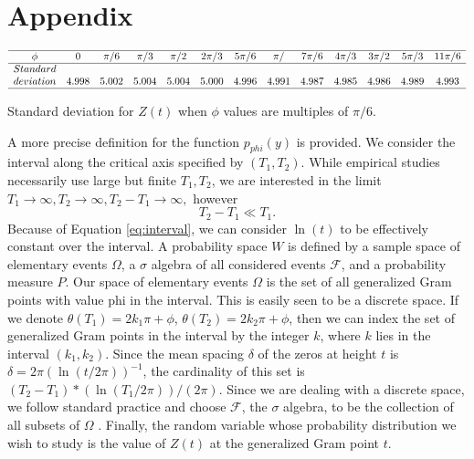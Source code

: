 \documentclass{mcom-l}
\theoremstyle{definition}
\theoremstyle{remark}
\numberwithin{equation}{section}
\begin{document}
\section*{\label{appendix} Appendix}

\begin{table}
\centering \(\begin{array}{ccccccccccccc}
\hline
\phi & 0& \pi/6 &  \pi/3 &  \pi/2 & 2 \pi/3 & 5\pi/6 & \pi/ & 7\pi/6 & 4\pi/3 & 3\pi/2 & 5\pi/3 & 11\pi/6 \\
\hline
Standard& \\
deviation & 4.998& 5.002& 5.004& 5.004& 5.000& 4.996& 4.991& 4.987& 4.985& 4.986& 4.989& 4.993\\
\hline
\end{array}\)
\caption{Standard deviation for  $Z(t)$ when $\phi$ values are multiples of $\pi/6$.}
\label{tab:stddev6}
\end{table}

A more precise definition for the function $p_{phi}(y)$ is provided. We consider the interval along the critical axis specified by $(T_1, T_2)$. While empirical studies necessarily use large but finite  $T_1, T_2$, we are interested in the limit 
$T_1 \rightarrow \infty, T_2 \rightarrow \infty,  T_2-T_1 \rightarrow \infty,$ however
\begin{equation}
T_2 - T_1  \ll T_1. 
\label{eq:interval}
\end{equation}
Because of Equation \ref{eq:interval}, we can consider  $\ln (t)$  to be effectively constant over  the interval. A probability space $W$ is defined by a sample space of elementary events $\Omega$, a $\sigma$ algebra of all considered events $\mathcal{F}$, and a probability measure $P$. Our space of elementary events $\Omega$ is the set of all generalized Gram points with value phi in the interval. This is easily seen to be a discrete space. If we denote $\theta (T_1) = 2k_1\pi + \phi$, $\theta (T_2) = 2k_2\pi + \phi$, then we can index the set of generalized Gram points in the interval by the integer  $k$, where $k$ lies in the interval $(k_1, k_2)$. Since the mean spacing $\delta$ of the zeros at height $t$ is $\delta = 2\pi(\ln (t/2\pi))^{-1}$, the cardinality of this set is $(T_2 - T_1)*(\ln (T_1/2\pi))/(2\pi)$. Since we are dealing with a discrete space, we follow standard practice and choose $\mathcal{F}$,  the  $\sigma$ algebra, to be the collection of all subsets of $\Omega$ . Finally, the random variable whose probability distribution we wish to study is the value of $Z(t)$ at the generalized Gram point $t$.
\end{document}
